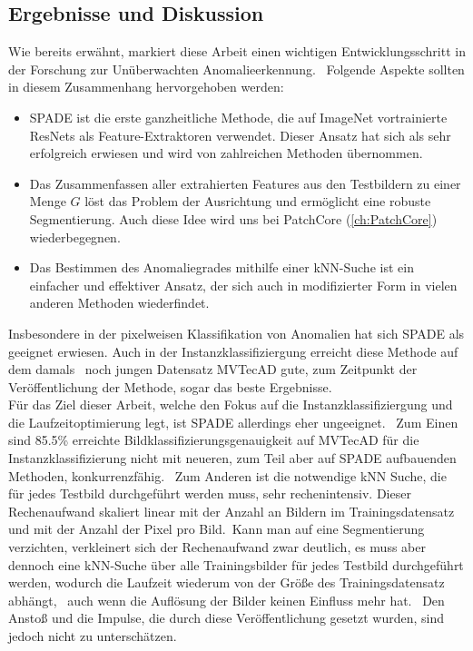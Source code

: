 \subsection{Ergebnisse und Diskussion}\label{subsec:SPADEResults}
Wie bereits erwähnt, markiert diese Arbeit einen wichtigen Entwicklungsschritt in der Forschung zur Unüberwachten Anomalieerkennung. \
Folgende Aspekte sollten in diesem Zusammenhang hervorgehoben werden:
\begin{itemize}
  \item SPADE ist die erste ganzheitliche Methode, die auf ImageNet vortrainierte ResNets als Feature-Extraktoren verwendet. Dieser Ansatz hat sich als sehr erfolgreich erwiesen und wird von zahlreichen Methoden übernommen. \
  \item Das Zusammenfassen aller extrahierten Features aus den Testbildern zu einer Menge $G$ löst das Problem der Ausrichtung und ermöglicht eine robuste Segmentierung. Auch diese Idee wird uns bei PatchCore (\ref{ch:PatchCore}) wiederbegegnen.\
  \item Das Bestimmen des Anomaliegrades mithilfe einer kNN-Suche ist ein einfacher und effektiver Ansatz, der sich auch in modifizierter Form in vielen anderen Methoden wiederfindet.\
\end{itemize}
Insbesondere in der pixelweisen Klassifikation von Anomalien hat sich SPADE als geeignet erwiesen. Auch in der Instanzklassifiziergung erreicht diese Methode auf dem damals \
noch jungen Datensatz MVTecAD gute, zum Zeitpunkt der Veröffentlichung der Methode, sogar das beste Ergebnisse.\\
Für das Ziel dieser Arbeit, welche den Fokus auf die Instanzklassifiziergung und die Laufzeitoptimierung legt, ist SPADE allerdings eher ungeeignet. \
Zum Einen sind \num{85,5}\% erreichte Bildklassifizierungsgenauigkeit auf MVTecAD für die Instanzklassifizierung nicht mit neueren, zum Teil aber auf SPADE aufbauenden Methoden, konkurrenzfähig. \
Zum Anderen ist die notwendige kNN Suche, die für jedes Testbild durchgeführt werden muss, sehr rechenintensiv. Dieser Rechenaufwand skaliert linear mit der Anzahl an Bildern im Trainingsdatensatz und mit der Anzahl der Pixel pro Bild.\
Kann man auf eine Segmentierung verzichten, verkleinert sich der Rechenaufwand zwar deutlich, es muss aber dennoch eine kNN-Suche über alle Trainingsbilder für jedes Testbild durchgeführt werden, wodurch die Laufzeit wiederum von der Größe des Trainingsdatensatz abhängt, \ 
auch wenn die Auflösung der Bilder keinen Einfluss mehr hat. \
Den Anstoß und die Impulse, die durch diese Veröffentlichung gesetzt wurden, sind jedoch nicht zu unterschätzen. \

